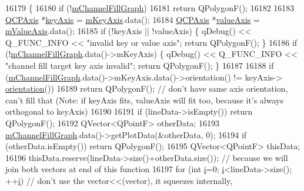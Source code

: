 \begin{DoxyCode}
16179 \{
16180   \textcolor{keywordflow}{if} (!\hyperlink{class_q_c_p_graph_a2f1777c7accf8244fc640c33f0b04577}{mChannelFillGraph})
16181     \textcolor{keywordflow}{return} QPolygonF();
16182   
16183   \hyperlink{class_q_c_p_axis}{QCPAxis} *\hyperlink{class_q_c_p_abstract_plottable_a72c7a09c22963f2c943f07112b311103}{keyAxis} = \hyperlink{class_q_c_p_abstract_plottable_a426f42e254d0f8ce5436a868c61a6827}{mKeyAxis}.data();
16184   \hyperlink{class_q_c_p_axis}{QCPAxis} *\hyperlink{class_q_c_p_abstract_plottable_a3106f9d34d330a6097a8ec5905e5b519}{valueAxis} = \hyperlink{class_q_c_p_abstract_plottable_a2901452ca4aea911a1827717934a4bda}{mValueAxis}.data();
16185   \textcolor{keywordflow}{if} (!keyAxis || !valueAxis) \{ qDebug() << Q\_FUNC\_INFO << \textcolor{stringliteral}{"invalid key or value axis"}; \textcolor{keywordflow}{return} QPolygonF();
       \}
16186   \textcolor{keywordflow}{if} (!\hyperlink{class_q_c_p_graph_a2f1777c7accf8244fc640c33f0b04577}{mChannelFillGraph}.data()->mKeyAxis) \{ qDebug() << Q\_FUNC\_INFO << \textcolor{stringliteral}{"channel fill
       target key axis invalid"}; \textcolor{keywordflow}{return} QPolygonF(); \}
16187   
16188   \textcolor{keywordflow}{if} (\hyperlink{class_q_c_p_graph_a2f1777c7accf8244fc640c33f0b04577}{mChannelFillGraph}.data()->mKeyAxis.data()->orientation() != keyAxis->
      \hyperlink{class_q_c_p_axis_a57483f2f60145ddc9e63f3af53959265}{orientation}())
16189     \textcolor{keywordflow}{return} QPolygonF(); \textcolor{comment}{// don't have same axis orientation, can't fill that (Note: if keyAxis fits,
       valueAxis will fit too, because it's always orthogonal to keyAxis)}
16190   
16191   \textcolor{keywordflow}{if} (lineData->isEmpty()) \textcolor{keywordflow}{return} QPolygonF();
16192   QVector<QPointF> otherData;
16193   \hyperlink{class_q_c_p_graph_a2f1777c7accf8244fc640c33f0b04577}{mChannelFillGraph}.data()->getPlotData(&otherData, 0);
16194   \textcolor{keywordflow}{if} (otherData.isEmpty()) \textcolor{keywordflow}{return} QPolygonF();
16195   QVector<QPointF> thisData;
16196   thisData.reserve(lineData->size()+otherData.size()); \textcolor{comment}{// because we will join both vectors at end of this
       function}
16197   \textcolor{keywordflow}{for} (\textcolor{keywordtype}{int} \hyperlink{_comparision_pictures_2_createtest_image_8m_a6f6ccfcf58b31cb6412107d9d5281426}{i}=0; \hyperlink{_comparision_pictures_2_createtest_image_8m_a6f6ccfcf58b31cb6412107d9d5281426}{i}<lineData->size(); ++\hyperlink{_comparision_pictures_2_createtest_image_8m_a6f6ccfcf58b31cb6412107d9d5281426}{i}) \textcolor{comment}{// don't use the vector<<(vector),  it squeezes internally,
}
\end{DoxyCode}
